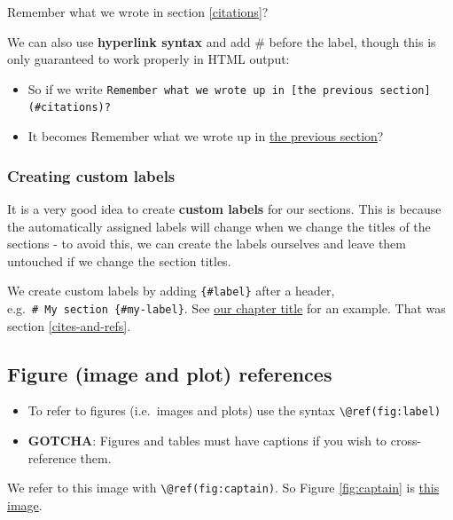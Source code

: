 \documentclass[a4paper, nobind]{templates/ociamthesis}
\providecommand{\tightlist}{%
  \setlength{\itemsep}{0pt}\setlength{\parskip}{0pt}}
\begin{document}
Remember what we wrote in section \ref{citations}?

We can also use \textbf{hyperlink syntax} and add \# before the label, though this is only guaranteed to work properly in HTML output:

\begin{itemize}
\tightlist
\item
  So if we write \texttt{Remember\ what\ we\ wrote\ up\ in\ {[}the\ previous\ section{]}(\#citations)?}
\item
  It becomes Remember what we wrote up in \protect\hyperlink{citations}{the previous section}?
\end{itemize}

\hypertarget{creating-custom-labels}{%
\subsubsection{Creating custom labels}\label{creating-custom-labels}}

It is a very good idea to create \textbf{custom labels} for our sections. This is because the automatically assigned labels will change when we change the titles of the sections - to avoid this, we can create the labels ourselves and leave them untouched if we change the section titles.

We create custom labels by adding \texttt{\{\#label\}} after a header, e.g.~\texttt{\#\ My\ section\ \{\#my-label\}}.
See \protect\hyperlink{cites-and-refs}{our chapter title} for an example. That was section \ref{cites-and-refs}.

\hypertarget{figure-image-and-plot-references}{%
\subsection{Figure (image and plot) references}\label{figure-image-and-plot-references}}

\begin{itemize}
\tightlist
\item
  To refer to figures (i.e.~images and plots) use the syntax \texttt{\textbackslash{}@ref(fig:label)}
\item
  \textbf{GOTCHA}: Figures and tables must have captions if you wish to cross-reference them.
\end{itemize}

We refer to this image with \texttt{\textbackslash{}@ref(fig:captain)}.
So Figure \ref{fig:captain} is \protect\hyperlink{fig:captain}{this image}.
\end{document}
